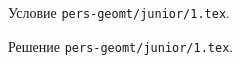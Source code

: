 \problem
Условие \texttt{pers-geomt/junior/1.tex}.

\solution Решение \texttt{pers-geomt/junior/1.tex}.
\endproblem
